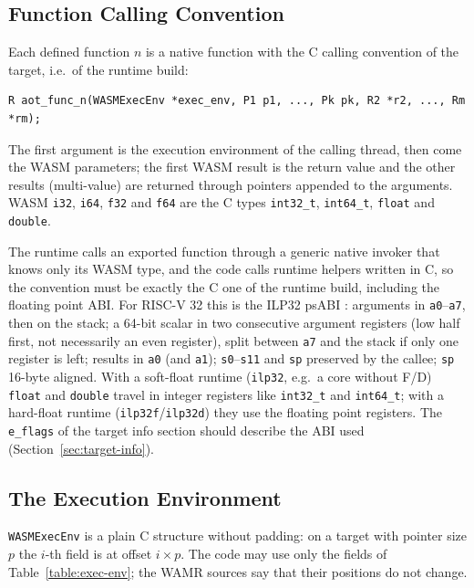 \documentclass{article}
\begin{document}
\subsection{Function Calling Convention}
\label{sec:abi-call}
Each defined function $n$ is a native function with the C calling convention of the target, i.e.\ of the runtime build:
\begin{verbatim}
R aot_func_n(WASMExecEnv *exec_env, P1 p1, ..., Pk pk, R2 *r2, ..., Rm *rm);
\end{verbatim}
The first argument is the execution environment of the calling thread, then come the WASM parameters; the first WASM result is the return value and the other results (multi-value) are returned through pointers appended to the arguments.
WASM \verb|i32|, \verb|i64|, \verb|f32| and \verb|f64| are the C types \verb|int32_t|, \verb|int64_t|, \verb|float| and \verb|double|.

The runtime calls an exported function through a generic native invoker that knows only its WASM type, and the code calls runtime helpers written in C, so the convention must be exactly the C one of the runtime build, including the floating point ABI.
For RISC-V 32 this is the ILP32 psABI \cite{riscv-elf-psabi-v1.0}: arguments in \verb|a0|--\verb|a7|, then on the stack; a 64-bit scalar in two consecutive argument registers (low half first, not necessarily an even register), split between \verb|a7| and the stack if only one register is left; results in \verb|a0| (and \verb|a1|); \verb|s0|--\verb|s11| and \verb|sp| preserved by the callee; \verb|sp| 16-byte aligned.
With a soft-float runtime (\texttt{ilp32}, e.g.\ a core without F/D) \verb|float| and \verb|double| travel in integer registers like \verb|int32_t| and \verb|int64_t|; with a hard-float runtime (\texttt{ilp32f}/\texttt{ilp32d}) they use the floating point registers.
The \verb|e_flags| of the target info section should describe the ABI used (Section~\ref{sec:target-info}).

\subsection{The Execution Environment}
\label{sec:abi-exec-env}
\verb|WASMExecEnv| is a plain C structure without padding: on a target with pointer size $p$ the $i$-th field is at offset $i \times p$.
The code may use only the fields of Table~\ref{table:exec-env}; the WAMR sources say that their positions do not change.
\end{document}
